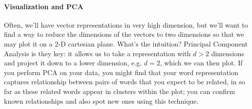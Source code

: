 \documentclass[12pt]{article}
\begin{document}
\paragraph{Visualization and PCA} Often, we'll have vector representations in very high dimension, but we'll want to find a way to reduce the dimensions of the vectors to two dimensions so that we may plot it on a 2-D cartesian plane. What's the intuition? Principal Component Analysis is they key: it allows us to take a representation with $d > 2$ dimensions and project it down to a lower dimension, e.g. $d=2$, which we can then plot. If you perform PCA on your data, you might find that your word representation captures relationship between pairs of words that you expect to be related, in so far as these related words appear in clusters within the plot; you can confirm known relationships and also spot new ones using this technique.
\end{document}
